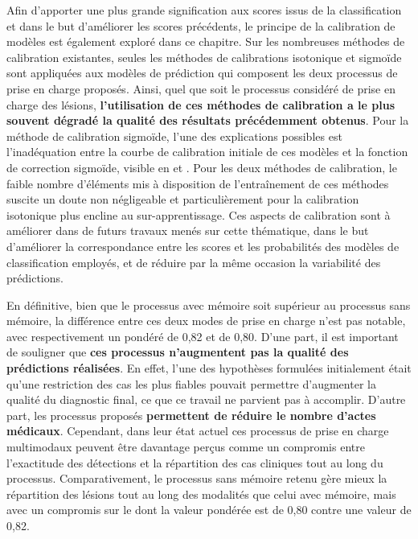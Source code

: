 Afin d'apporter une plus grande signification aux scores issus de la classification et dans le but d'améliorer les scores précédents, le principe de la calibration de modèles est également exploré dans ce chapitre. Sur les nombreuses méthodes de calibration existantes, seules les méthodes de calibrations isotonique et sigmoïde sont appliquées aux modèles de prédiction qui composent les deux processus de prise en charge proposés. Ainsi, quel que soit le processus considéré de prise en charge des lésions, \textbf{l'utilisation de ces méthodes de calibration a le plus souvent dégradé la qualité des résultats précédemment obtenus}. Pour la méthode de calibration sigmoïde, l'une des explications possibles est l'inadéquation entre la courbe de calibration initiale de ces modèles et la fonction de correction sigmoïde, visible en  et . Pour les deux méthodes de calibration, le faible nombre d'éléments mis à disposition de l'entraînement de ces méthodes suscite un doute non négligeable et particulièrement pour la calibration isotonique plus encline au sur-apprentissage. Ces aspects de calibration sont à améliorer dans de futurs travaux menés sur cette thématique, dans le but d'améliorer la correspondance entre les scores et les probabilités des modèles de classification employés, et de réduire par la même occasion la variabilité des prédictions.\par

En définitive, bien que le processus avec mémoire soit supérieur au processus sans mémoire, la différence entre ces deux modes de prise en charge n'est pas notable, avec respectivement un \fscore{} pondéré de 0,82 et de 0,80. D'une part, il est important de souligner que \textbf{ces processus n'augmentent pas la qualité des prédictions réalisées}. En effet, l'une des hypothèses formulées initialement était qu'une restriction des cas les plus fiables pouvait permettre d'augmenter la qualité du diagnostic final, ce que ce travail ne parvient pas à accomplir. D'autre part, les processus proposés \textbf{permettent de réduire le nombre d'actes médicaux}. Cependant, dans leur état actuel ces processus de prise en charge multimodaux peuvent être davantage perçus comme un compromis entre l'exactitude des détections et la répartition des cas cliniques tout au long du processus. Comparativement, le processus sans mémoire retenu gère mieux la répartition des lésions tout au long des modalités que celui avec mémoire, mais avec un compromis sur le \fscore{} dont la valeur pondérée est de 0,80 contre une valeur de 0,82.\par

